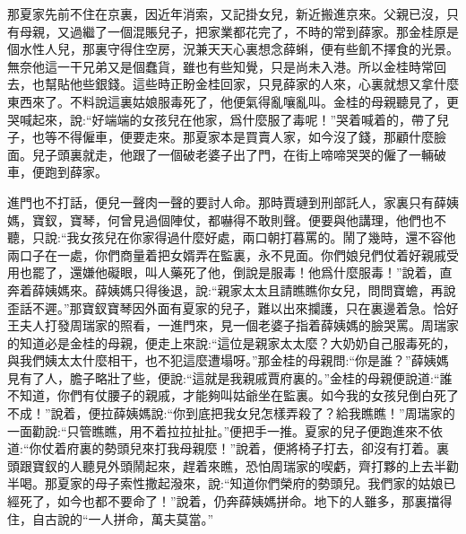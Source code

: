 \begin{parag}
    那夏家先前不住在京裏，因近年消索，又記掛女兒，新近搬進京來。父親已沒，只有母親，又過繼了一個混賬兒子，把家業都花完了，不時的常到薛家。那金桂原是個水性人兒，那裏守得住空房，況兼天天心裏想念薛蝌，便有些飢不擇食的光景。無奈他這一干兄弟又是個蠢貨，雖也有些知覺，只是尚未入港。所以金桂時常回去，也幫貼他些銀錢。這些時正盼金桂回家，只見薛家的人來，心裏就想又拿什麼東西來了。不料說這裏姑娘服毒死了，他便氣得亂嚷亂叫。金桂的母親聽見了，更哭喊起來，說:“好端端的女孩兒在他家，爲什麼服了毒呢！”哭着喊着的，帶了兒子，也等不得僱車，便要走來。那夏家本是買賣人家，如今沒了錢，那顧什麼臉面。兒子頭裏就走，他跟了一個破老婆子出了門，在街上啼啼哭哭的僱了一輛破車，便跑到薛家。
\end{parag}


\begin{parag}
    進門也不打話，便兒一聲肉一聲的要討人命。那時賈璉到刑部託人，家裏只有薛姨媽，寶釵，寶琴，何曾見過個陣仗，都嚇得不敢則聲。便要與他講理，他們也不聽，只說:“我女孩兒在你家得過什麼好處，兩口朝打暮罵的。鬧了幾時，還不容他兩口子在一處，你們商量着把女婿弄在監裏，永不見面。你們娘兒們仗着好親戚受用也罷了，還嫌他礙眼，叫人藥死了他，倒說是服毒！他爲什麼服毒！”說着，直奔着薛姨媽來。薛姨媽只得後退，說:“親家太太且請瞧瞧你女兒，問問寶蟾，再說歪話不遲。”那寶釵寶琴因外面有夏家的兒子，難以出來攔護，只在裏邊着急。恰好王夫人打發周瑞家的照看，一進門來，見一個老婆子指着薛姨媽的臉哭罵。周瑞家的知道必是金桂的母親，便走上來說:“這位是親家太太麼？大奶奶自己服毒死的，與我們姨太太什麼相干，也不犯這麼遭塌呀。”那金桂的母親問:“你是誰？”薛姨媽見有了人，膽子略壯了些，便說:“這就是我親戚賈府裏的。”金桂的母親便說道:“誰不知道，你們有仗腰子的親戚，才能夠叫姑爺坐在監裏。如今我的女孩兒倒白死了不成！”說着，便拉薛姨媽說:“你到底把我女兒怎樣弄殺了？給我瞧瞧！”周瑞家的一面勸說:“只管瞧瞧，用不着拉拉扯扯。”便把手一推。夏家的兒子便跑進來不依道:“你仗着府裏的勢頭兒來打我母親麼！”說着，便將椅子打去，卻沒有打着。裏頭跟寶釵的人聽見外頭鬧起來，趕着來瞧，恐怕周瑞家的喫虧，齊打夥的上去半勸半喝。那夏家的母子索性撒起潑來，說:“知道你們榮府的勢頭兒。我們家的姑娘已經死了，如今也都不要命了！”說着，仍奔薛姨媽拼命。地下的人雖多，那裏擋得住，自古說的“一人拼命，萬夫莫當。”
\end{parag}


